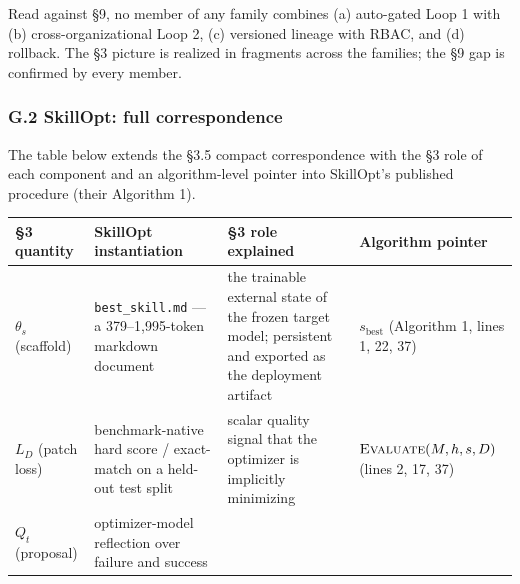 \documentclass[
]{article}
\newcounter{none} %
\begin{document}
Read against §9, no member of any family combines (a) auto-gated Loop 1
with (b) cross-organizational Loop 2, (c) versioned lineage with RBAC,
and (d) rollback. The §3 picture is realized in fragments across the
families; the §9 gap is confirmed by every member.

\subsubsection{G.2 SkillOpt: full
correspondence}\label{g.2-skillopt-full-correspondence}

The table below extends the §3.5 compact correspondence with the §3 role
of each component and an algorithm-level pointer into SkillOpt's
published procedure (their Algorithm 1).

{\def\LTcaptype{none} %
\begin{longtable}[]{@{}
  >{\raggedright\arraybackslash}p{}
  >{\raggedright\arraybackslash}p{}
  >{\raggedright\arraybackslash}p{}
  >{\raggedright\arraybackslash}p{}@{}}
\toprule\noalign{}
\begin{minipage}[b]{\linewidth}\raggedright
§3 quantity
\end{minipage} & \begin{minipage}[b]{\linewidth}\raggedright
SkillOpt instantiation
\end{minipage} & \begin{minipage}[b]{\linewidth}\raggedright
§3 role explained
\end{minipage} & \begin{minipage}[b]{\linewidth}\raggedright
Algorithm pointer
\end{minipage} \\
\midrule\noalign{}
\endhead
\bottomrule\noalign{}
\endlastfoot
\(\theta_s\) (scaffold) & \texttt{best\_skill.md} --- a 379--1,995-token
markdown document & the trainable external state of the frozen target
model; persistent and exported as the deployment artifact &
\(s_{\text{best}}\) (Algorithm 1, lines 1, 22, 37) \\
\(L_D\) (patch loss) & benchmark-native hard score / exact-match on a
held-out test split & scalar quality signal that the optimizer is
implicitly minimizing & \(\textsc{Evaluate}(M, h, s, D)\) (lines 2, 17,
37) \\
\(Q_t\) (proposal) & optimizer-model reflection over failure and success

\end{longtable}}
\end{document}
